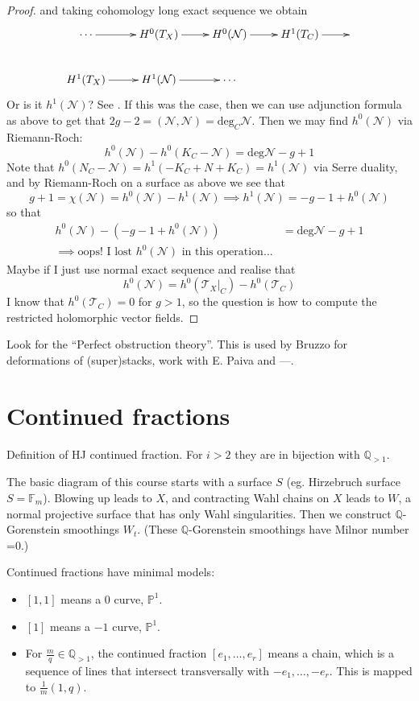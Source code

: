 \begin{proof}
and taking cohomology long exact sequence we obtain
$$
\xymatrix{
\cdots\ar[r]&H^{0}(T_X)\ar[r]&H^{0}(\mathcal{N})\ar[r]&H^{1}(T_C)\ar[r]&\\
H^{1}(T_X)\ar[r]&H^{1}(\mathcal{N})\ar[r]& \cdots
}
$$
\medskip\noindent
Or is it $h^1(\mathcal{N})$? See \cite{HarrMorr}. If this was the case, then we
can use adjunction formula as above to get that
$2g-2=(\mathcal{N},\mathcal{N})=\text{deg}_C \mathcal{N}$. Then we may find
$h^0(\mathcal{N})$ via Riemann-Roch:
$$
h^0(\mathcal{N})-h^0(K_C-\mathcal{N})=\text{deg}\mathcal{N}-g+1
$$
Note that $h^0(N_C-\mathcal{N})=h^1(-K_C+N+K_C)=h^1(\mathcal{N})$ via Serre
duality, and by Riemann-Roch on a surface as above we see that
$$
g+1=\chi(\mathcal{N})=h^0(\mathcal{N})-h^1(\mathcal{N})
\implies h^1(\mathcal{N})=-g-1+h^0(\mathcal{N})
$$
so that
\begin{align*}
h^0(\mathcal{N})-(-g-1+h^0(\mathcal{N}))&=\text{deg}\mathcal{N}-g+1\\
\implies \text{oops! I lost $h^0(\mathcal{N})$ in this operation…}
\end{align*}
Maybe if I just use normal exact sequence and realise that
$$
h^0(\mathcal{N})=h^0(\mathcal{T}_X|_{C})-h^0(\mathcal{T}_C)
$$
I know that $h^0(\mathcal{T}_C)=0$ for $g>1$, so the question is how to compute
the restricted holomorphic vector fields.
\end{proof}

\medskip\noindent
Look for the ``Perfect obstruction theory''.
This is used by Bruzzo for deformations of (super)stacks,
work with E. Paiva and ---.

\section{Continued fractions}
\label{section-continued-fractions}

Definition of HJ continued fraction. For $i>2$ they are in bijection with
$\mathbb{Q}_{>1}$.

The basic diagram of this course starts with a surface $S$ (eg. Hirzebruch
surface $S=\mathbb{F}_m$). Blowing up leads to $X$, and contracting Wahl chains
on $X$ leads to $W$, a normal projective surface that has only Wahl
singularities. Then we construct $\mathbb{Q}$-Gorenstein smoothings $W_t$.
(These  $\mathbb{Q}$-Gorenstein smoothings have Milnor number =0.)

Continued fractions have minimal models:
\begin{itemize}
\item $[1,1]$ means a 0 curve,  $\mathbb{P}^1$.
\item $[1]$ means a  $-1$ curve,  $\mathbb{P}^1$.
\item For $\frac{m}{q}\in\mathbb{Q}_{>1}$, the continued fraction
$[e_1,\ldots,e_r]$ means a chain, which is a sequence of lines that intersect
transversally with $-e_1,\ldots,-e_r$. This is mapped to $\frac{1}{m}(1,q)$.
\end{itemize}

